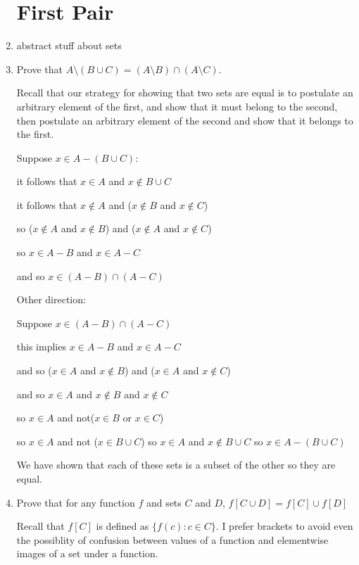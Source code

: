 \documentclass[12pt]{article}
\begin{document}
\begin{enumerate}

\section{First Pair}

\item[]   abstract stuff about sets

\item   Prove that $A \setminus (B \cup C) = (A \setminus B) \cap (A \setminus C)$.

Recall that our strategy for showing that two sets are equal is to postulate an arbitrary element of the first, and show that it must belong to the second, then postulate an arbitrary element of the second and show that it belongs to the first.

Suppose $x \in A-(B \cup C)$:  

it follows that $x \in A$ and $x \not\in B \cup C$

it follows that $x \not\in A$ and ($x \not\in B$ and $x \not\in C$)

so ($x \not\in A$ and $x \not\in B$) and ($x \not\in A$ and $x \not\in C$)

so $x \in A-B$ and $x \in A-C$

and so $x \in (A-B) \cap (A-C)$

Other direction:

Suppose $x \in (A-B) \cap (A-C)$

this implies $x \in A-B$ and $x \in A-C$

and so ($x \in A$ and $x \not\in B$) and ($x \in A$ and $x \not\in C$)

and so $x \in A$ and $x \not\in B$ and $x \not\in C$

so $x \in A$ and not($x \in B$ or $x \in C$)

so $x \in A$ and not ($x \in B \cup C$) so $x \in A$ and $x \not\in B \cup C$ so $x \in A-(B \cup C)$

We have shown that each of these sets is a subset of the other so they are equal.

\newpage

\item   Prove that for any function $f$ and sets $C$ and $D$, $f[C \cup D] = f[C] \cup f[D]$

Recall that $f[C]$ is defined as $\{f(c):c \in C\}$.  I prefer brackets to avoid even the possiblity of confusion between values of a function and elementwise images of a set under a function.


\end{enumerate}
\end{document}
